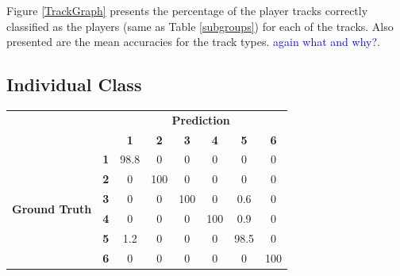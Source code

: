 \documentclass{article}
\newcommand{\carl}[1]{\textcolor{blue}{#1}}
\begin{document}
{{{Figure \ref{TrackGraph} presents the percentage of the player tracks correctly classified as the players (same as Table \ref{subgroups}) for each of the tracks. Also presented are the mean accuracies for the track types. \carl{again what and why?}. 

\subsection{Individual Class}

\begin{table}[h!]

    \begin{minipage}{.5\linewidth}
      \centering


\begin{tabular}{cc|c|c|c|c|c|c|}
\cline{3-8}
\multicolumn{1}{l}{}                                     & \multicolumn{1}{l|}{} & \multicolumn{6}{c|}{\textbf{Prediction}}                              \\ \cline{3-8} 
\multicolumn{1}{l}{}                                          & \multicolumn{1}{l|}{} & \textbf{1} & \textbf{2} & \textbf{3} & \textbf{4} & \textbf{5} & \textbf{6} \\ \hline
\multicolumn{1}{|c|}{\multirow{6}{*}{\begin{turn}{90}\textbf{Ground Truth}\end{turn}}} & \textbf{1}            & 98.8     & 0          & 0          & 0          & 0          & 0          \\ \cline{2-8} 
\multicolumn{1}{|c|}{}                                        & \textbf{2}            & 0          & 
100    & 0          & 0          & 0          & 0          \\ \cline{2-8} 
\multicolumn{1}{|c|}{}                                        & \textbf{3}            & 0          & 0          & 100     & 0          & 0.6     & 0          \\ \cline{2-8} 
\multicolumn{1}{|c|}{}                                        & \textbf{4}            & 0          & 0          & 0          & 100     & 0.9     & 0          \\ \cline{2-8} 
\multicolumn{1}{|c|}{}                                        & \textbf{5}            & 1.2     & 0          & 0          & 0          & 98.5     & 0          \\ \cline{2-8} 
\multicolumn{1}{|c|}{}                                   & \textbf{6}            & 0          & 0          & 0          & 0          & 0          & 100     \\ \hline

\end{tabular}
\end{minipage}
\end{table}}}}
\end{document}
